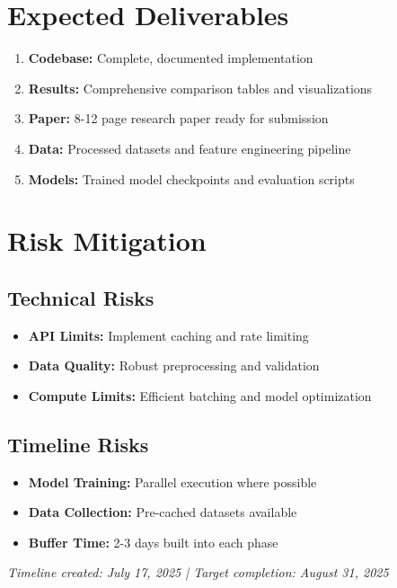 \documentclass[11pt]{article}
\begin{document}
\section{Expected Deliverables}

\begin{enumerate}
    \item \textbf{Codebase:} Complete, documented implementation
    \item \textbf{Results:} Comprehensive comparison tables and visualizations
    \item \textbf{Paper:} 8-12 page research paper ready for submission
    \item \textbf{Data:} Processed datasets and feature engineering pipeline
    \item \textbf{Models:} Trained model checkpoints and evaluation scripts
\end{enumerate}

\section{Risk Mitigation}

\subsection{Technical Risks}
\begin{itemize}
    \item \textbf{API Limits:} Implement caching and rate limiting
    \item \textbf{Data Quality:} Robust preprocessing and validation
    \item \textbf{Compute Limits:} Efficient batching and model optimization
\end{itemize}

\subsection{Timeline Risks}
\begin{itemize}
    \item \textbf{Model Training:} Parallel execution where possible
    \item \textbf{Data Collection:} Pre-cached datasets available
    \item \textbf{Buffer Time:} 2-3 days built into each phase
\end{itemize}

\vfill
\begin{center}
\textit{Timeline created: July 17, 2025 | Target completion: August 31, 2025}
\end{center}
\end{document}

